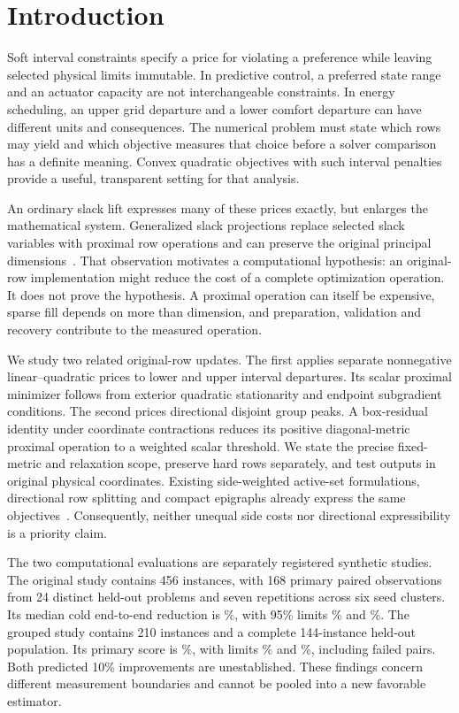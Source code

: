 \section{Introduction}\label{sec:introduction}
Soft interval constraints specify a price for violating a preference while
leaving selected physical limits immutable. In predictive control, a preferred
state range and an actuator capacity are not interchangeable constraints.
In energy scheduling, an upper grid departure and a lower comfort departure
can have different units and consequences. The numerical problem must state
which rows may yield and which objective measures that choice before a solver
comparison has a definite meaning. Convex quadratic objectives with such
interval penalties provide a useful, transparent setting for that analysis.

An ordinary slack lift expresses many of these prices exactly, but enlarges
the mathematical system. Generalized slack projections replace selected slack
variables with proximal row operations and can preserve the original principal
dimensions~\cite{gsp,lew}. That observation motivates a computational hypothesis:
an original-row implementation might reduce the cost of a complete optimization
operation. It does not prove the hypothesis. A proximal operation can itself
be expensive, sparse fill depends on more than dimension, and preparation,
validation and recovery contribute to the measured operation.

We study two related original-row updates. The first applies separate
nonnegative linear--quadratic prices to lower and upper interval departures.
Its scalar proximal minimizer follows from exterior quadratic stationarity
and endpoint subgradient conditions. The second prices directional disjoint
group peaks. A box-residual identity under coordinate contractions reduces
its positive diagonal-metric proximal operation to a weighted scalar threshold.
We state the precise fixed-metric and relaxation scope, preserve hard rows
separately, and test outputs in original physical coordinates. Existing
side-weighted active-set formulations, directional row splitting and compact
epigraphs already express the same objectives~\cite{daqp,gsp}. Consequently,
neither unequal side costs nor directional expressibility is a priority claim.

The two computational evaluations are separately registered synthetic studies.
The original study contains 456 instances, with 168 primary paired observations
from 24 distinct held-out problems and seven repetitions across six seed clusters.
Its median cold end-to-end reduction is \OriginalEstimate\%, with 95\% limits
\OriginalLower\% and \OriginalUpper\%. The grouped study contains 210 instances
and a complete 144-instance held-out population. Its primary score is
\PrimaryEstimate\%, with limits \PrimaryLower\% and \PrimaryUpper\%, including
\PrimaryFailed{} failed pairs. Both predicted 10\% improvements are unestablished.
These findings concern different measurement boundaries and cannot be pooled
into a new favorable estimator.

